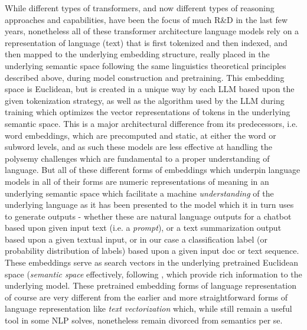 \documentclass[final]{clv2025-revised}
\begin{document}
While different types of transformers, and now different types of reasoning approaches and capabilities, have been the focus of much R\&D in the last few years, nonetheless all of these transformer architecture language models rely on a representation of language (text) that is first tokenized and then indexed, and then mapped to the underlying embedding structure, really placed in the underlying semantic space following the same linguistics theoretical principles described above, during model construction and pretraining. This embedding space is Euclidean, but is created in a unique way by each LLM based upon the given tokenization strategy, as well as the algorithm used by the LLM during training which optimizes the vector representations of tokens in the underlying semantic space. This is a major architectural difference from its predecessors, i.e. word embeddings, which are precomputed and static, at either the word or subword levels, and as such these models are less effective at handling the polysemy challenges which are fundamental to a proper understanding of language. But all of these different forms of embeddings which underpin language models in all of their forms are numeric representations of meaning in an underlying semantic space which facilitate a machine \textit{understanding} of the underlying language as it has been presented to the model which it in turn uses to generate outputs - whether these are natural language outputs for a chatbot based upon given input text (i.e. a \textit{prompt}), or a text summarization output based upon a given textual input, or in our case a classification label (or probability distribution of labels) based upon a given input doc or text sequence. These embeddings serve as search vectors in the underlying pretrained Euclidean space (\textit{semantic space} effectively, following \cite{worth}, which provide rich information to the underlying model. These pretrained embedding forms of language representation of course are very different from the earlier and more straightforward forms of language representation like \textit{text vectorization} which, while still remain a useful tool in some NLP solves, nonetheless remain divorced from semantics per se. 
\end{document}
